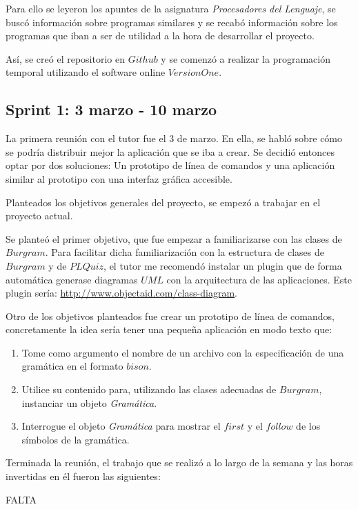 Para ello se leyeron los apuntes de la asignatura \textit{Procesadores del Lenguaje}, se buscó información sobre programas similares y se recabó información sobre los programas que iban a ser de utilidad a la hora de desarrollar el proyecto.

Así, se creó el repositorio en $Github$ y se comenzó a realizar la programación temporal utilizando el software online $VersionOne$. 

\subsection{Sprint 1: 3 marzo - 10 marzo}

La primera reunión con el tutor fue el 3 de marzo. En ella, se habló sobre cómo se podría distribuir mejor la aplicación que se iba a crear. Se decidió entonces optar por dos soluciones: Un prototipo de línea de comandos y una aplicación similar al prototipo con una interfaz gráfica accesible.

Planteados los objetivos generales del proyecto, se empezó a trabajar en el proyecto actual. 

Se planteó el primer objetivo, que fue empezar a familiarizarse con las clases de $Burgram$. Para facilitar dicha familiarización  con la estructura de clases de $Burgram$ y de $PLQuiz$, el tutor me recomendó instalar un plugin que de forma automática generase diagramas $UML$ con la arquitectura de las aplicaciones. Este plugin sería: \url{http://www.objectaid.com/class-diagram}.

Otro de los objetivos planteados fue crear un prototipo de línea de comandos, concretamente la idea sería tener una pequeña aplicación en modo texto que:

\begin{enumerate}
\item Tome como argumento el nombre de un archivo con la especificación de una gramática en el formato $bison$.
\item Utilice su contenido para, utilizando las clases adecuadas de $Burgram$, instanciar un objeto \textit{Gramática}.
\item Interrogue el objeto \textit{Gramática} para mostrar el $first$ y el $follow$ de los símbolos de la gramática.
\end{enumerate}

Terminada la reunión, el trabajo que se realizó a lo largo de la semana y las horas invertidas en él fueron las siguientes:

FALTA 

